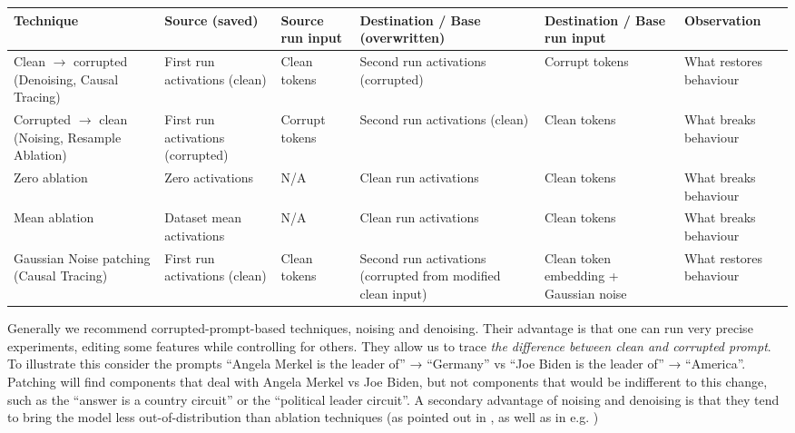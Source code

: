 \documentclass[nonatbib]{article}
\begin{document}
\begin{adjustbox}{width=1.2\textwidth,center=\textwidth}
  \begin{tabular}{p{3.6cm}p{2.5cm}lp{3.5cm}p{2.3cm}p{1.89cm}}
    \toprule
    Technique & Source (saved) & Source run input & Destination / Base (overwritten) & Destination / Base run input & Observation \\
    \midrule
    Clean $\rightarrow$ corrupted (Denoising, Causal Tracing\footnotemark[2]) & First run activations (clean) & Clean tokens & Second run activations (corrupted) & Corrupt tokens & What restores behaviour \\
    Corrupted $\rightarrow$ clean (Noising, Resample Ablation) & First run activations (corrupted) & Corrupt tokens & Second run activations (clean) & Clean tokens & What breaks behaviour \\
    Zero ablation & Zero activations & N/A & Clean run activations & Clean tokens & What breaks behaviour \\
    Mean ablation & Dataset mean activations & N/A & Clean run activations & Clean tokens & What breaks behaviour \\
    Gaussian Noise patching (Causal Tracing\footnotemark[2]) & First run activations (clean) & Clean tokens & Second run activations (corrupted from modified clean input) & Clean token embedding + Gaussian noise & What restores behaviour \\
    \bottomrule
  \end{tabular}
\end{adjustbox}


Generally we recommend corrupted-prompt-based techniques, noising and denoising. Their advantage is that one can run very precise experiments, editing some features while controlling for others. They allow us to trace \textit{the difference between clean and corrupted prompt}. To illustrate this consider the prompts “Angela Merkel is the leader of” → “Germany” vs “Joe Biden is the leader of” → “America”. Patching will find components that deal with Angela Merkel vs Joe Biden, but not components that would be indifferent to this change, such as the “answer is a country circuit” or the “political leader circuit”. A secondary advantage of noising and denoising is that they tend to bring the model less out-of-distribution than ablation techniques (as pointed out in \citet{causal_scrubbing}, as well as in e.g. \cite{2021arXiv210600786H})
\end{document}

